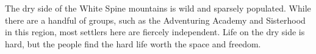 The dry side of the White Spine mountains is wild and sparsely populated.
While there are a handful of groups, such as the Adventuring Academy and Sisterhood in this region, most settlers here are fiercely independent.
Life on the dry side is hard, but the people find the hard life worth the space and freedom.
